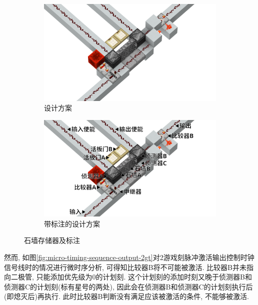 \documentclass{article}
\begin{document}
    \begin{figure}[t]
        \centering
        \begin{subfigure}{0.75\linewidth}
            \centering
            \includegraphics[width=\linewidth]{figures/wall-based-storage-1.png}
            \caption{设计方案}
            \label{fig:wall-based-storage}
        \end{subfigure}
        \begin{subfigure}{0.75\linewidth}
            \centering
            \includegraphics[width=\linewidth]{figures/wall-based-storage-2.png}
            \caption{带标注的设计方案}
            \label{fig:wall-based-storage-marked}
        \end{subfigure}
        \caption{石墙存储器及标注}
    \end{figure}

    然而, 如图\ref{fig:micro-timing-sequence-output-2gt}对2游戏刻脉冲激活输出控制时钟信号线时的情况进行微时序分析, 可得知比较器B将不可能被激活. 比较器B并未指向二极管, 只能添加优先级为0的计划刻. 这个计划刻的添加时刻又晚于侦测器B和侦测器C的计划刻(标有星号的两处), 因此会在侦测器B和侦测器C的计划刻执行后(即熄灭后)再执行. 此时比较器B判断没有满足应该被激活的条件, 不能够被激活.
\end{document}
